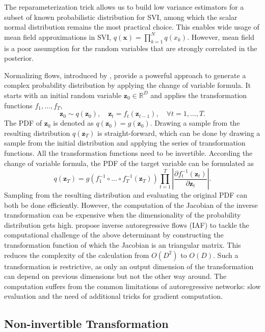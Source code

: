\documentclass{article}
\newcommand{\xV}{\mathbf{x}}
\newcommand{\R}{\mathbb{R}}
\newcommand{\zV}{\mathbf{z}}
\begin{document}
The reparameterization trick allows us to build low variance estimators for a subset of known probabilistic distribution for SVI, among which the scalar normal distribution remains the most practical choice. This enables wide usage of mean field approximations in SVI, $q(\xV) = \prod_{k=1}^N q(x_k)$. However, mean field is a poor assumption for the random variables that are strongly correlated in the posterior. 

Normalizing flows, introduced by \cite{JimenezRezendeMohamed2015}, provide a powerful approach to generate a complex probability distribution by applying the change of variable formula. It starts with an initial random variable $\zV_0 \in \R^D$ and applies the transformation functions $f_1, \ldots, f_T$, 
$$
\zV_0 \sim q(\zV_0), \quad  \zV_t = f_t(\zV_{t-1}),\quad \forall t=1,\ldots, T.
$$
The PDF of $\zV_0$ is denoted as $q(\zV_0)=g(\zV_0)$. Drawing a sample from the resulting distribution $q(\zV_T)$ is straight-forward, which can be done by drawing a sample from the initial distribution and applying the series of transformation functions.
%
All the transformation functions need to be invertible. According the change of variable formula, the PDF of the target variable can be formulated as
\begin{equation}
q(\zV_T) = g(f_1^{-1} \circ \ldots \circ f_T^{-1}(\zV_T)) \prod_{t=1}^T \left| \frac{\partial f_t^{-1}(\zV_t)}{\partial \zV_t}\right|. \label{eqn:nf_pdf}
\end{equation}
%
Sampling from the resulting distribution and evaluating the original PDF can both be done efficiently. However, the computation of the Jacobian of the inverse transformation can be expensive when the dimensionality of the probability distribution gets high. \cite{KingmaEtAl2016}  propose inverse autoregressive flows (IAF) to tackle the computational challenge of the above determinant by constructing the transformation function of which the Jacobian is an triangular matrix. This reduces the complexity of the calculation from $O(D^2)$ to $O(D)$. Such a transformation is restrictive, as only an output dimension of the transformation can depend on previous dimensions but not the other way around. The computation suffers from the common limitations of autoregressive networks: slow evaluation and the need of additional tricks for gradient computation.

\subsection{Non-invertible Transformation}
\end{document}
